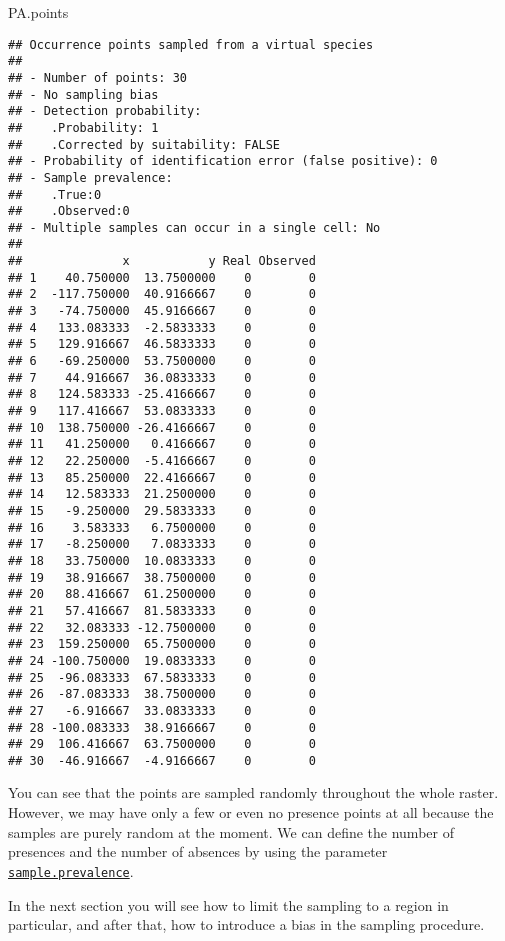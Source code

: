 \documentclass[]{article}
\newenvironment{Shaded}{\begin{snugshade}}{\end{snugshade}}
\newcommand{\NormalTok}[1]{#1}
\begin{document}
\begin{Shaded}
\begin{Highlighting}[]
\NormalTok{PA.points}
\end{Highlighting}
\end{Shaded}

\begin{verbatim}
## Occurrence points sampled from a virtual species
## 
## - Number of points: 30
## - No sampling bias
## - Detection probability: 
##    .Probability: 1
##    .Corrected by suitability: FALSE
## - Probability of identification error (false positive): 0
## - Sample prevalence: 
##    .True:0
##    .Observed:0
## - Multiple samples can occur in a single cell: No
## 
##              x           y Real Observed
## 1    40.750000  13.7500000    0        0
## 2  -117.750000  40.9166667    0        0
## 3   -74.750000  45.9166667    0        0
## 4   133.083333  -2.5833333    0        0
## 5   129.916667  46.5833333    0        0
## 6   -69.250000  53.7500000    0        0
## 7    44.916667  36.0833333    0        0
## 8   124.583333 -25.4166667    0        0
## 9   117.416667  53.0833333    0        0
## 10  138.750000 -26.4166667    0        0
## 11   41.250000   0.4166667    0        0
## 12   22.250000  -5.4166667    0        0
## 13   85.250000  22.4166667    0        0
## 14   12.583333  21.2500000    0        0
## 15   -9.250000  29.5833333    0        0
## 16    3.583333   6.7500000    0        0
## 17   -8.250000   7.0833333    0        0
## 18   33.750000  10.0833333    0        0
## 19   38.916667  38.7500000    0        0
## 20   88.416667  61.2500000    0        0
## 21   57.416667  81.5833333    0        0
## 22   32.083333 -12.7500000    0        0
## 23  159.250000  65.7500000    0        0
## 24 -100.750000  19.0833333    0        0
## 25  -96.083333  67.5833333    0        0
## 26  -87.083333  38.7500000    0        0
## 27   -6.916667  33.0833333    0        0
## 28 -100.083333  38.9166667    0        0
## 29  106.416667  63.7500000    0        0
## 30  -46.916667  -4.9166667    0        0
\end{verbatim}

You can see that the points are sampled randomly throughout the whole
raster. However, we may have only a few or even no presence points at
all because the samples are purely random at the moment. We can define
the number of presences and the number of absences by using the
parameter
\protect\hyperlink{defining-the-sample-prevalence}{\texttt{sample.prevalence}}.

In the next section you will see how to limit the sampling to a region
in particular, and after that, how to introduce a bias in the sampling
procedure.
\end{document}
